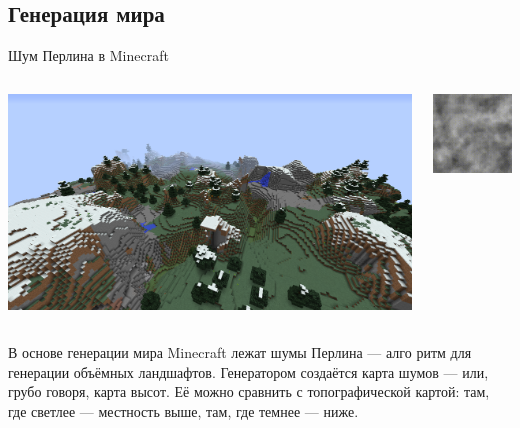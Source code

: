 \documentclass[handout]{beamer}
\begin{document}
    \subsection{Генерация мира}
    \begin{frame}{Шум Перлина в Minecraft}
        \begin{columns}
            \begin{column}{0.7\textwidth}
                \includegraphics[width=\textwidth]{img/mine_perlin_noise.png}
            \end{column}
            \begin{column}{0.3\textwidth}
                \includegraphics[width=\textwidth]{img/AggravatingThoseArieltoucan-0.png}
            \end{column}
        \end{columns}
        \begin{justify}
            В основе генерации мира Minecraft лежат шумы Перлина — алго ритм для генерации объёмных ландшафтов. Генератором создаётся карта шумов — или, грубо говоря, карта высот. Её можно сравнить с топографической картой: там, где светлее — местность выше, там, где темнее — ниже.
        \end{justify}
    \end{frame}
    
\end{document}
